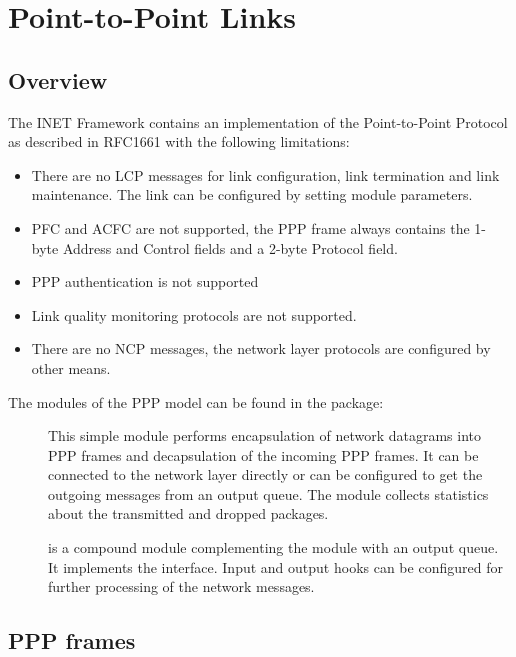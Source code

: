 \chapter{Point-to-Point Links}
\label{cha:ppp}


\section{Overview}

The INET Framework contains an implementation of the Point-to-Point Protocol
as described in RFC1661 with the following limitations:

\begin{itemize}
\item There are no LCP messages for link configuration,
link termination and link maintenance.
The link can be configured by setting module parameters.
\item PFC and ACFC are not supported, the PPP frame
always contains the 1-byte Address and Control fields
and a 2-byte Protocol field.
\item PPP authentication is not supported
\item Link quality monitoring protocols are not supported.
\item There are no NCP messages, the network layer protocols are
configured by other means.
\end{itemize}

The modules of the PPP model can be found in the 
package:

\begin{description}
\item[] This simple module performs encapsulation
of network datagrams into PPP frames and decapsulation of
the incoming PPP frames. It can be connected to the network
layer directly or can be configured to get the outgoing messages
from an output queue. The module collects statistics about
the transmitted and dropped packages.

\item[] is a compound module complementing
the  module with an output queue. It implements
the  interface. Input and output hooks can be configured
for further processing of the network messages.

\end{description}

\section{PPP frames}


